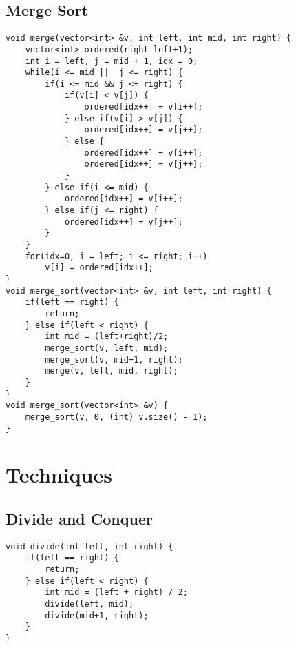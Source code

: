 \documentclass[10pt,letterpaper,twocolumn,twosided]{article}
\begin{document}
\subsection{Merge Sort}
\begin{lstlisting}
void merge(vector<int> &v, int left, int mid, int right) {
    vector<int> ordered(right-left+1);
    int i = left, j = mid + 1, idx = 0;
    while(i <= mid ||  j <= right) {
        if(i <= mid && j <= right) {
            if(v[i] < v[j]) {
                ordered[idx++] = v[i++];    
            } else if(v[i] > v[j]) {
                ordered[idx++] = v[j++];
            } else {
                ordered[idx++] = v[i++];
                ordered[idx++] = v[j++];
            }
        } else if(i <= mid) {
            ordered[idx++] = v[i++];
        } else if(j <= right) {
            ordered[idx++] = v[j++];
        }
    }
    for(idx=0, i = left; i <= right; i++)
        v[i] = ordered[idx++];
}
void merge_sort(vector<int> &v, int left, int right) {
    if(left == right) {
        return;
    } else if(left < right) {
        int mid = (left+right)/2;
        merge_sort(v, left, mid);
        merge_sort(v, mid+1, right);
        merge(v, left, mid, right);    
    }
}
void merge_sort(vector<int> &v) {
    merge_sort(v, 0, (int) v.size() - 1);
}
\end{lstlisting}

\section{Techniques}

\subsection{Divide and Conquer}
\begin{lstlisting}
void divide(int left, int right) {
    if(left == right) {
        return;
    } else if(left < right) {
        int mid = (left + right) / 2;
        divide(left, mid);
        divide(mid+1, right);
    }
}
\end{lstlisting}
\end{document}

